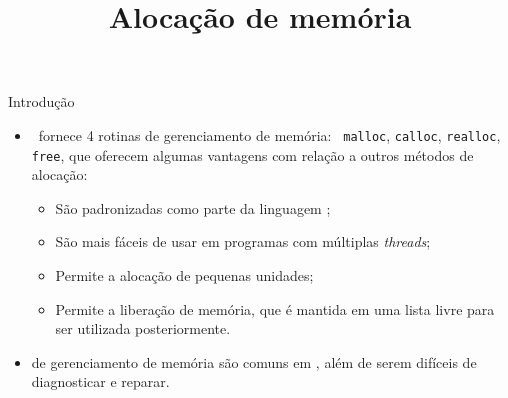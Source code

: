 \title{Alocação de memória}
\frame{\maketitle}



\begin{frame}{Introdução}

\begin{itemize}
\item \CEE\ fornece 4 rotinas de gerenciamento de memória: {\tt
malloc}, {\tt calloc}, {\tt realloc}, {\tt free}, que oferecem algumas
vantagens com relação a outros métodos de alocação:
\begin{itemize}
\item São padronizadas como parte da linguagem \CEE;
\item São mais fáceis de usar em programas com múltiplas {\it
threads};
\item Permite a alocação de pequenas unidades;
\item Permite a liberação de memória, que é mantida em uma lista livre
para ser utilizada posteriormente.
\end{itemize}

\item {} de gerenciamento de memória são comuns em \CEE, além de
serem difíceis de diagnosticar e reparar.
\end{itemize}
\end{frame}


